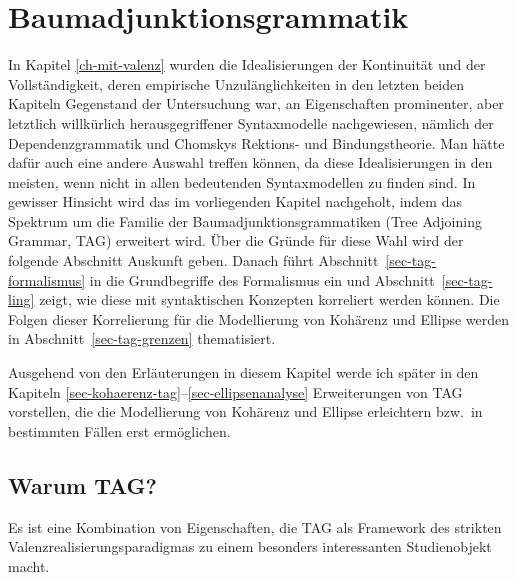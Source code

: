 
\chapter{Baumadjunktionsgrammatik} \label{sec-valenz-tag}

In Kapitel \ref{ch-mit-valenz} wurden die Idealisierungen der Kontinuität und der Vollständigkeit, deren empirische Unzulänglichkeiten in den letzten beiden Kapiteln Gegenstand der Untersuchung war, an Eigenschaften prominenter, aber letztlich willkürlich herausgegriffener Syntaxmodelle nachgewiesen, nämlich der Dependenzgrammatik und Chomskys Rektions- und Bindungstheorie. Man hätte dafür auch eine andere Auswahl treffen können, da diese Idealisierungen in den meisten, wenn nicht in allen bedeutenden Syntaxmodellen zu finden sind. In gewisser Hinsicht wird das im vorliegenden Kapitel nachgeholt, indem das Spektrum um die Familie der Baumadjunktionsgrammatiken (Tree Adjoining Grammar, TAG) erweitert wird. Über die Gründe für diese Wahl wird der folgende Abschnitt Auskunft geben. Danach führt Abschnitt~\ref{sec-tag-formalismus} in die Grundbegriffe des Formalismus ein und Abschnitt~\ref{sec-tag-ling} zeigt, wie diese mit syntaktischen Konzepten korreliert werden können. Die Folgen dieser Korrelierung für die Modellierung von Kohärenz und Ellipse werden in Abschnitt~\ref{sec-tag-grenzen} thematisiert. 

Ausgehend von den Erläuterungen in diesem Kapitel werde ich später in den Kapiteln \ref{sec-kohaerenz-tag}--\ref{sec-ellipsenanalyse} Erweiterungen von TAG vorstellen, die die Modellierung von Kohärenz und Ellipse erleichtern bzw.\ in bestimmten Fällen erst ermöglichen. 

\section{Warum TAG?}

Es ist eine Kombination von Eigenschaften, die TAG als Framework des strikten Valenzrealisierungsparadigmas zu einem besonders interessanten Studienobjekt macht.

